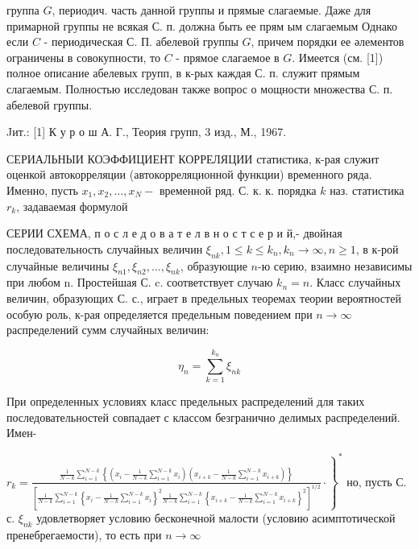 \documentclass[10pt]{article}
\begin{document}
группа $G$, периодич. часть данной группы и прямые слагаемые. Даже для примарной группы не всякая С. п. должна быть ее прям ым слагаемым Однако если $C$ - периодическая С. П. абелевой группы $G$, причем порядки ее әлементов ограничены в совокупности, то $C$ - прямое слагаемое в $G$. Имеется (см. [1]) полное описание абелевых групп, в к-рых каждая С. п. служит прямым слагаемым. Полностью исследован также вопрос о мощности множества С. п. абелевой группы.



Jит.: [1] К у р о ш А. Г., Теория групп, 3 изд., М., 1967.



СЕРИАЛЬНЫИ КОЭФФИЦИЕНТ КОРРЕЛЯЦИИ статистика, к-рая служит оценкой автокорреляции (автокорреляционной функции) временного ряда. Именно, пусть $x_{1}, x_{2}, \ldots, x_{N}-$ временной ряд. С. к. к. порядка $k$ наз. статистика $r_{k}$, задаваемая формулой



СЕРИИ СХЕМА, п о с л е д о в а т е л в н о с т с е р и й,- двойная последовательность случайных величин $\xi_{n k}, 1 \leqslant k \leqslant k_{n}, k_{n} \rightarrow \infty, n \geqslant 1$, в к-рой случайные величины $\xi_{n 1}, \xi_{n 2}, \ldots, \xi_{n k}$, образующие $n$-ю серию, взаимно независимы при любом n. Простейшая С. c. соответствует случаю $k_{n}=n$. Класс случайных величин, образующих С. с., играет в предельных теоремах теории вероятностей особую роль, к-рая определяется предельным поведением при $n \rightarrow \infty$ распределений сумм случайных величин:



\[

\eta_{n}=\sum_{k=1}^{k_{n}} \xi_{n k}

\]



При определенных условиях класс предельных распределений для таких последовательностей совпадает с классом безгранично делимых распределений. Имен-



$\left.r_{k}=\frac{\frac{1}{N-k} \sum_{i=1}^{N-k}\left\{\left(x_{i}-\frac{1}{N-k} \sum_{i=1}^{N-k} x_{i}\right)\left(x_{i+k}-\frac{1}{N-k} \sum_{i=1}^{N-k} x_{i+k}\right)\right\}}{\left[\frac{1}{N-k} \sum_{i=1}^{N-k}\left\{x_{i}-\frac{1}{N-k} \sum_{i=1}^{N-k} x_{i}\right\}^{2} \frac{1}{N-k} \sum_{i=1}^{N-k}\left\{x_{i+k}-\frac{1}{N-k} \sum_{i=1}^{N-k} x_{i+k}\right\}^{2}\right]^{1 / 2}} \cdot\right\}^{*}$ но, пусть С. с. $\xi_{n k}$ удовлетворяет условию бесконечной малости (условию асимптотической пренебрегаемости), то есть при $n \rightarrow \infty$
\end{document}
